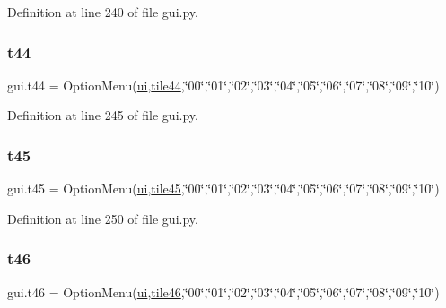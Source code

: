 Definition at line 240 of file gui.\+py.

\mbox{\label{namespacegui_ad2995237a38478e1524b0742655d3a52}} 
\subsubsection{\texorpdfstring{t44}{t44}}
{\footnotesize\ttfamily gui.\+t44 = Option\+Menu(\mbox{\hyperlink{namespacegui_a40ab7281456eadbea2dc2038f5c24fa1}{ui}},\mbox{\hyperlink{namespacegui_af46f15a9a3ebad6b6b8e98adb5eb0f2d}{tile44}},\char`\"{}00\char`\"{},\char`\"{}01\char`\"{},\char`\"{}02\char`\"{},\char`\"{}03\char`\"{},\char`\"{}04\char`\"{},\char`\"{}05\char`\"{},\char`\"{}06\char`\"{},\char`\"{}07\char`\"{},\char`\"{}08\char`\"{},\char`\"{}09\char`\"{},\char`\"{}10\char`\"{})}



Definition at line 245 of file gui.\+py.

\mbox{\label{namespacegui_a4ba8213015870947fb113938370c780d}} 
\subsubsection{\texorpdfstring{t45}{t45}}
{\footnotesize\ttfamily gui.\+t45 = Option\+Menu(\mbox{\hyperlink{namespacegui_a40ab7281456eadbea2dc2038f5c24fa1}{ui}},\mbox{\hyperlink{namespacegui_ac936253f399ab927a2fd3a8b1be73902}{tile45}},\char`\"{}00\char`\"{},\char`\"{}01\char`\"{},\char`\"{}02\char`\"{},\char`\"{}03\char`\"{},\char`\"{}04\char`\"{},\char`\"{}05\char`\"{},\char`\"{}06\char`\"{},\char`\"{}07\char`\"{},\char`\"{}08\char`\"{},\char`\"{}09\char`\"{},\char`\"{}10\char`\"{})}



Definition at line 250 of file gui.\+py.

\mbox{\label{namespacegui_ab72c0c9ec8577738389412a4861e90da}} 
\subsubsection{\texorpdfstring{t46}{t46}}
{\footnotesize\ttfamily gui.\+t46 = Option\+Menu(\mbox{\hyperlink{namespacegui_a40ab7281456eadbea2dc2038f5c24fa1}{ui}},\mbox{\hyperlink{namespacegui_a7121cbe6f2d65b30d9c5e3eedb79679b}{tile46}},\char`\"{}00\char`\"{},\char`\"{}01\char`\"{},\char`\"{}02\char`\"{},\char`\"{}03\char`\"{},\char`\"{}04\char`\"{},\char`\"{}05\char`\"{},\char`\"{}06\char`\"{},\char`\"{}07\char`\"{},\char`\"{}08\char`\"{},\char`\"{}09\char`\"{},\char`\"{}10\char`\"{})}



